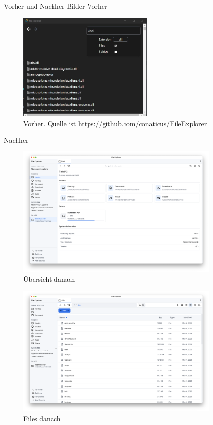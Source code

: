 \LARGE 
Vorher und Nachher Bilder \newline
\vspace{0.2cm}
\large 
Vorher
\begin{figure}[H]
    \centering
    \includegraphics[width=0.6\textwidth]{before-after-images/before.png}
    \caption{Vorher. Quelle ist https://github.com/conaticus/FileExplorer}
\end{figure}

\large 
Nachher


\begin{figure}[H]
    \centering
    \includegraphics[width=0.9\textwidth]{before-after-images/Overview.png}
    \caption{Übersicht danach}
\end{figure}

\begin{figure}[H]
    \centering
    \includegraphics[width=0.9\textwidth]{before-after-images/Files.png}
    \caption{Files danach}
\end{figure}

